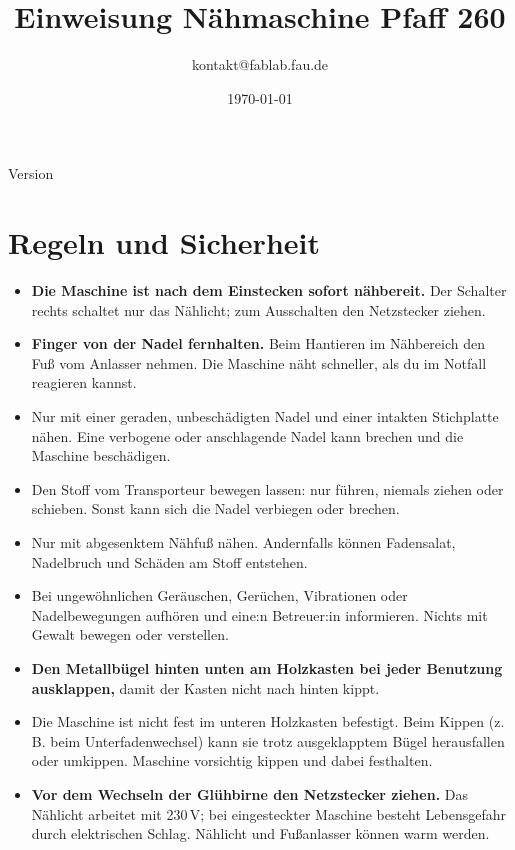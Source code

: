 \documentclass{\basedir/fablab-document}
\date{\today}
\author{kontakt@fablab.fau.de}
\title{Einweisung Nähmaschine Pfaff 260}
\begin{document}
\maketitle
\begin{center}
{\small Version \Version}
\end{center}

\section{Regeln und Sicherheit}
\begin{itemize}
 \item \textbf{Die Maschine ist nach dem Einstecken sofort nähbereit.} Der Schalter rechts schaltet nur das Nählicht; zum Ausschalten den Netzstecker ziehen.
 \item \textbf{Finger von der Nadel fernhalten.} Beim Hantieren im Nähbereich den Fuß vom Anlasser nehmen. Die Maschine näht schneller, als du im Notfall reagieren kannst.
 \item Nur mit einer geraden, unbeschädigten Nadel und einer intakten Stichplatte nähen. Eine verbogene oder anschlagende Nadel kann brechen und die Maschine beschädigen.
 \item Den Stoff vom Transporteur bewegen lassen: nur führen, niemals ziehen oder schieben. Sonst kann sich die Nadel verbiegen oder brechen.
 \item Nur mit abgesenktem Nähfuß nähen. Andernfalls können Fadensalat, Nadelbruch und Schäden am Stoff entstehen.
 \item Bei ungewöhnlichen Geräuschen, Gerüchen, Vibrationen oder Nadelbewegungen aufhören und eine:n Betreuer:in informieren. Nichts mit Gewalt bewegen oder verstellen.
 \item \textbf{Den Metallbügel hinten unten am Holzkasten bei jeder Benutzung ausklappen,} damit der Kasten nicht nach hinten kippt.
 \item Die Maschine ist nicht fest im unteren Holzkasten befestigt. Beim Kippen (z.\,B. beim Unterfadenwechsel) kann sie trotz ausgeklapptem Bügel herausfallen oder umkippen. Maschine vorsichtig kippen und dabei festhalten.
 \item \textbf{Vor dem Wechseln der Glühbirne den Netzstecker ziehen.} Das Nählicht arbeitet mit 230\,V; bei eingesteckter Maschine besteht Lebensgefahr durch elektrischen Schlag. Nählicht und Fußanlasser können warm werden.
\end{itemize}

\clearpage
\renewcommand{\contentsname}{Inhaltsverzeichnis / Arbeitsablauf}
\setcounter{tocdepth}{2}
\tableofcontents
\clearpage
\end{document}
